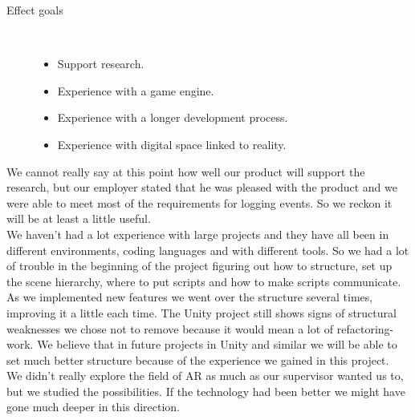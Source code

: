 \begin{description}
	\item[Effect goals]\ 
	\begin{itemize}
		\item Support research.
		\item Experience with a game engine.
		\item Experience with a longer development process.
		\item Experience with digital space linked to reality.
	\end{itemize}
\end{description}
We cannot really say at this point how well our product will support the research, but our employer stated that he was pleased with the product and we were able to meet most of the requirements for logging events. 
So we reckon it will be at least a little useful.\\
We haven't had a lot experience with large projects and they have all been in different environments, coding languages and with different tools. 
So we had a lot of trouble in the beginning of the project figuring out how to structure, set up the scene hierarchy, where to put scripts and how to make scripts communicate.
As we implemented new features we went over the structure several times, improving it a little each time. 
The Unity project still shows signs of structural weaknesses we chose not to remove because it would mean a lot of refactoring-work. 
We believe that in future projects in Unity and similar we will be able to set much better structure because of the experience we gained in this project.\\
We didn't really explore the field of AR as much as our supervisor wanted us to, but we studied the possibilities. 
If the technology had been better we might have gone much deeper in this direction.
